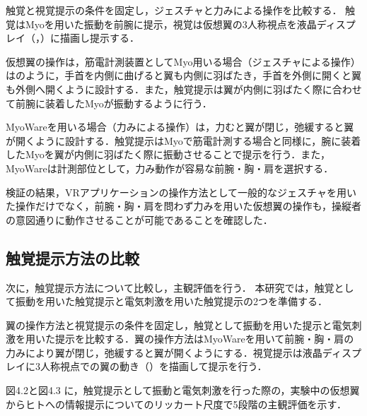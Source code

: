         触覚と視覚提示の条件を固定し，ジェスチャと力みによる操作を比較する． 触覚はMyoを用いた振動を前腕に提示，視覚は仮想翼の3人称視点を液晶ディスプレイ（，）に描画し提示する．

        仮想翼の操作は，筋電計測装置としてMyo用いる場合（ジェスチャによる操作）はのように，手首を内側に曲げると翼も内側に羽ばたき，手首を外側に開くと翼も外側へ開くように設計する．また，触覚提示は翼が内側に羽ばたく際に合わせて前腕に装着したMyoが振動するように行う．
        
        MyoWareを用いる場合（力みによる操作）は，力むと翼が閉じ，弛緩すると翼が開くように設計する．触覚提示はMyoで筋電計測する場合と同様に，腕に装着したMyoを翼が内側に羽ばたく際に振動させることで提示を行う．また，MyoWareは計測部位として，力み動作が容易な前腕・胸・肩を選択する．

        検証の結果，VRアプリケーションの操作方法として一般的なジェスチャを用いた操作だけでなく，前腕・胸・肩を問わず力みを用いた仮想翼の操作も，操縦者の意図通りに動作させることが可能であることを確認した．

    \subsection{触覚提示方法の比較}
        次に，触覚提示方法について比較し，主観評価を行う．
        本研究では，触覚として振動を用いた触覚提示と電気刺激を用いた触覚提示の2つを準備する．

        翼の操作方法と視覚提示の条件を固定し，触覚として振動を用いた提示と電気刺激を用いた提示を比較する．翼の操作方法はMyoWareを用いて前腕・胸・肩の力みにより翼が閉じ，弛緩すると翼が開くようにする．視覚提示は液晶ディスプレイに3人称視点での翼の動き（）を描画して提示を行う．

        図4.2と図4.3
        に，触覚提示として振動と電気刺激を行った際の，実験中の仮想翼からヒトへの情報提示についてのリッカート尺度で5段階の主観評価を示す．

